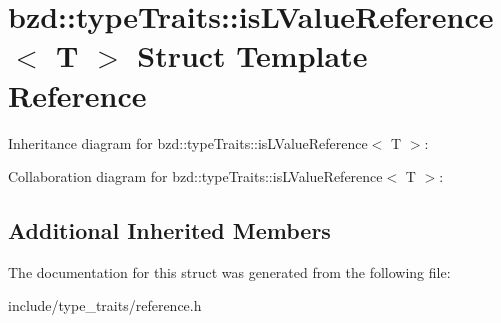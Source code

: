 \hypertarget{structbzd_1_1typeTraits_1_1isLValueReference}{}\section{bzd\+:\+:type\+Traits\+:\+:is\+L\+Value\+Reference$<$ T $>$ Struct Template Reference}
\label{structbzd_1_1typeTraits_1_1isLValueReference}


Inheritance diagram for bzd\+:\+:type\+Traits\+:\+:is\+L\+Value\+Reference$<$ T $>$\+:


Collaboration diagram for bzd\+:\+:type\+Traits\+:\+:is\+L\+Value\+Reference$<$ T $>$\+:
\subsection*{Additional Inherited Members}


The documentation for this struct was generated from the following file\+:\begin{DoxyCompactItemize}
\item 
include/type\+\_\+traits/reference.\+h\end{DoxyCompactItemize}
